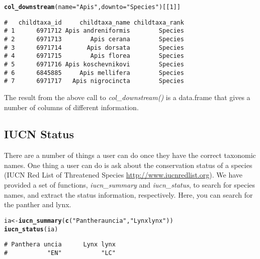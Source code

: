\documentclass[10pt,a4paper,twocolumn]{article}\usepackage[]{graphicx}\usepackage[]{color}
\makeatletter
\newcommand{\hlnum}[1]{\textcolor[rgb]{0.686,0.059,0.569}{#1}}%
\newcommand{\hlstr}[1]{\textcolor[rgb]{0.192,0.494,0.8}{#1}}%
\newcommand{\hlstd}[1]{\textcolor[rgb]{0.345,0.345,0.345}{#1}}%
\newcommand{\hlkwb}[1]{\textcolor[rgb]{0.69,0.353,0.396}{#1}}%
\newcommand{\hlkwc}[1]{\textcolor[rgb]{0.333,0.667,0.333}{#1}}%
\newcommand{\hlkwd}[1]{\textcolor[rgb]{0.737,0.353,0.396}{\textbf{#1}}}%
\newenvironment{kframe}{%
 \def\at@end@of@kframe{}%
 \ifinner\ifhmode%
  \def\at@end@of@kframe{\end{minipage}}%
  \begin{minipage}{\columnwidth}%
 \fi\fi%
 \def\FrameCommand##1{\hskip\@totalleftmargin \hskip-\fboxsep
 \colorbox{shadecolor}{##1}\hskip-\fboxsep
     \hskip-\linewidth \hskip-\@totalleftmargin \hskip\columnwidth}%
 \MakeFramed {\advance\hsize-\width
   \@totalleftmargin\z@ \linewidth\hsize
   \@setminipage}}%
 {\par\unskip\endMakeFramed%
 \at@end@of@kframe}
\newenvironment{knitrout}{}{} %
\makeatother
\begin{document}
\begin{knitrout}\scriptsize
{}\color{fgcolor}\begin{kframe}
\begin{alltt}
\hlkwd{col_downstream}\hlstd{(}\hlkwc{name} \hlstd{=} \hlstr{"Apis"}\hlstd{,} \hlkwc{downto} \hlstd{=} \hlstr{"Species"}\hlstd{)[[}\hlnum{1}\hlstd{]]}
\end{alltt}
\begin{verbatim}
#   childtaxa_id     childtaxa_name childtaxa_rank
# 1      6971712 Apis andreniformis        Species
# 2      6971713        Apis cerana        Species
# 3      6971714       Apis dorsata        Species
# 4      6971715        Apis florea        Species
# 5      6971716 Apis koschevnikovi        Species
# 6      6845885     Apis mellifera        Species
# 7      6971717   Apis nigrocincta        Species
\end{verbatim}
\end{kframe}
\end{knitrout}



The result from the above call to \emph{col\_downstream()} is a data.frame that gives a number of columns of different information.

\subsection*{IUCN Status}
There are a number of things a user can do once they have the correct taxonomic names. One thing a user can do is ask about the conservation status of a species (IUCN Red List of Threatened Species \url{http://www.iucnredlist.org}). We have provided a set of functions, \emph{iucn\_summary} and \emph{iucn\_status}, to search for species names, and extract the status information, respectively. Here, you can search for the panther and lynx.

\begin{knitrout}\scriptsize
{}\color{fgcolor}\begin{kframe}
\begin{alltt}
\hlstd{ia} \hlkwb{<-} \hlkwd{iucn_summary}\hlstd{(}\hlkwd{c}\hlstd{(}\hlstr{"Panthera uncia"}\hlstd{,} \hlstr{"Lynx lynx"}\hlstd{))}
\hlkwd{iucn_status}\hlstd{(ia)}
\end{alltt}
\begin{verbatim}
# Panthera uncia      Lynx lynx 
#           "EN"           "LC"
\end{verbatim}
\end{kframe}
\end{knitrout}
\end{document}
